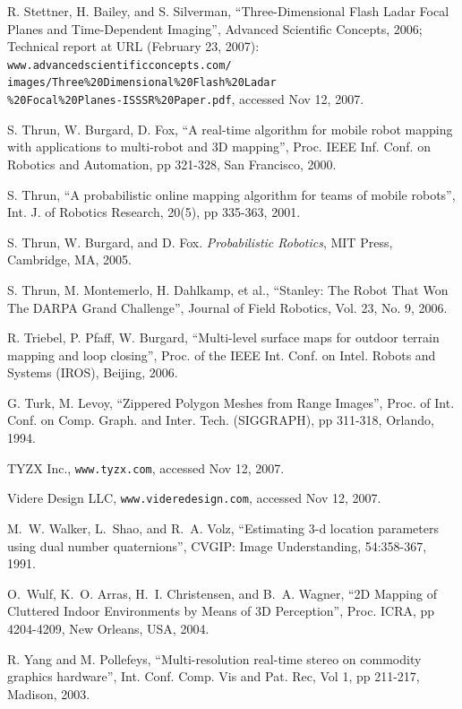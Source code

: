 \documentclass[twocolumn,oneside]{book}
\begin{document}
\begin{thebibliography}{99}
R. Stettner, H. Bailey, and S. Silverman,
``Three-Dimensional Flash Ladar Focal Planes and Time-Dependent Imaging'',
Advanced Scientific Concepts, 2006;
Technical report at URL (February 23, 2007):
\verb+www.advancedscientificconcepts.com/+\\
\verb+images/Three%20Dimensional%20Flash%20Ladar+\\
\verb+%20Focal%20Planes-ISSSR%20Paper.pdf+, accessed Nov 12, 2007.

S. Thrun, W. Burgard, D. Fox,
``A real-time algorithm for mobile robot mapping with applications to
multi-robot and 3D mapping'',  
Proc. IEEE Inf. Conf. on Robotics and Automation, pp 321-328, San Francisco, 2000.

S. Thrun, 
``A probabilistic online mapping algorithm for teams of mobile robots'',
Int. J. of Robotics Research, 20(5), pp 335-363, 2001.

S. Thrun, W. Burgard, and D. Fox. 
{\em Probabilistic Robotics}, MIT Press, Cambridge, MA, 2005.

S. Thrun, M. Montemerlo, H. Dahlkamp, et al.,
``Stanley: The Robot That Won The DARPA Grand Challenge'',
Journal of Field Robotics, Vol. 23, No. 9, 2006.

R. Triebel, P. Pfaff, W. Burgard,
``Multi-level surface maps for outdoor terrain mapping and loop closing'',
Proc. of the IEEE Int. Conf. on Intel. Robots and Systems (IROS), Beijing, 2006.

G. Turk, M. Levoy,
``Zippered Polygon Meshes from Range Images'',
Proc.  of Int. Conf. on Comp. Graph. and Inter. Tech. (SIGGRAPH), pp 311-318, Orlando, 1994.

TYZX Inc.,
\verb+www.tyzx.com+, accessed Nov 12, 2007.

Videre Design LLC,
\verb+www.videredesign.com+, accessed Nov 12, 2007.

M.~W. Walker, L.~Shao, and R.~A. Volz,
``Estimating 3-d location parameters using dual number quaternions'',
CVGIP: Image Understanding, 54:358-367, 1991.

O.~Wulf, K.~O. Arras, H.~I. Christensen, and B.~A. Wagner,
``{2D} {M}apping of {C}luttered {I}ndoor {E}nvironments by {M}eans of
  {3D} {P}erception'',
Proc. ICRA, pp 4204-4209, New Orleans, USA, 2004.

R. Yang and M. Pollefeys,
``Multi-resolution real-time stereo on commodity graphics hardware'',
Int. Conf. Comp. Vis and Pat. Rec, Vol 1, pp 211-217, Madison, 2003.


\end{thebibliography}
\end{document}
